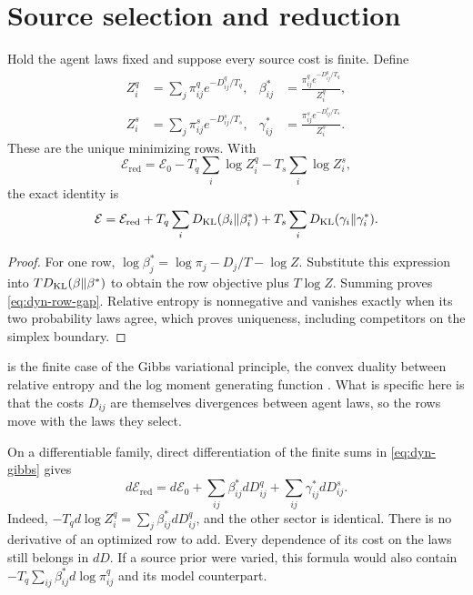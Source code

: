 \section{Source selection and reduction}
\label{sec:dyn-rows}

Hold the agent laws fixed and suppose every source cost is finite. Define
\begin{equation}
 \begin{aligned}
 Z_i^q&=\sum_j\pi_{ij}^q e^{-D^q_{ij}/T_q},&
 \beta_{ij}^*&=\frac{\pi_{ij}^q e^{-D^q_{ij}/T_q}}{Z_i^q},\\
 Z_i^s&=\sum_j\pi_{ij}^s e^{-D^s_{ij}/T_s},&
 \gamma_{ij}^*&=\frac{\pi_{ij}^s e^{-D^s_{ij}/T_s}}{Z_i^s}.
 \end{aligned}
 \label{eq:dyn-gibbs}
\end{equation}
These are the unique minimizing rows. With
\begin{equation}
 \mathcal E_{\mathrm{red}}
 =\mathcal E_0-T_q\sum_i\log Z_i^q-T_s\sum_i\log Z_i^s,
 \label{eq:dyn-reduced}
\end{equation}
the exact identity is
\begin{equation}
 \mathcal E=\mathcal E_{\mathrm{red}}
 +T_q\sum_iD_{\mathrm{KL}}(\beta_i\Vert\beta_i^*)
 +T_s\sum_iD_{\mathrm{KL}}(\gamma_i\Vert\gamma_i^*).
 \label{eq:dyn-row-gap}
\end{equation}
\begin{proof}
For one row, $\log\beta_j^*=\log\pi_j-D_j/T-\log Z$. Substitute this expression into $TD_{\mathrm{KL}}(\beta\Vert\beta^*)$ to obtain the row objective plus $T\log Z$. Summing proves \cref{eq:dyn-row-gap}. Relative entropy is nonnegative and vanishes exactly when its two probability laws agree, which proves uniqueness, including competitors on the simplex boundary.
\end{proof}

 is the finite case of the Gibbs variational principle, the convex duality between relative entropy and the log moment generating function \citep{DonskerVaradhan1975,DupuisEllis1997}. What is specific here is that the costs $D_{ij}$ are themselves divergences between agent laws, so the rows move with the laws they select.

On a differentiable family, direct differentiation of the finite sums in \cref{eq:dyn-gibbs} gives
\begin{equation}
 d\mathcal E_{\mathrm{red}}
 =d\mathcal E_0+\sum_{ij}\beta_{ij}^*dD^q_{ij}
                    +\sum_{ij}\gamma_{ij}^*dD^s_{ij}.
 \label{eq:dyn-envelope}
\end{equation}
Indeed, $-T_qd\log Z_i^q=\sum_j\beta_{ij}^*dD^q_{ij}$, and the other sector is identical. There is no derivative of an optimized row to add. Every dependence of its cost on the laws still belongs in $dD$. If a source prior were varied, this formula would also contain $-T_q\sum_{ij}\beta_{ij}^*d\log\pi_{ij}^q$ and its model counterpart.

